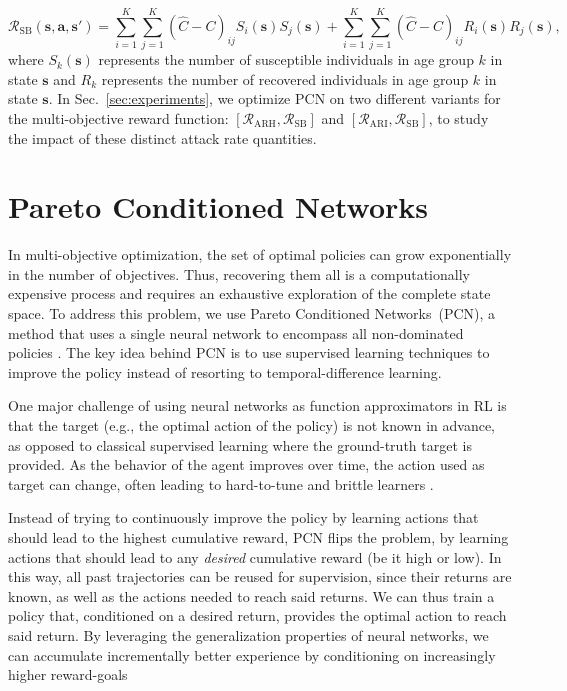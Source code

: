 \documentclass{article}
\renewcommand{\cite}[1]{\citep{#1}}
\newcommand{\mdprewardfn}{\mathcal{R}}
\newcommand{\mdpstate}{\mathbf{s}}
\newcommand{\mdpaction}{\mathbf{a}}
\newcommand{\agegroups}{K}
\begin{document}
\begin{equation}
    \mdprewardfn_{\text{SB}}(\mdpstate,\mdpaction,\mdpstate') = \sum_{i=1}^{\agegroups}\sum_{j=1}^{\agegroups}(\hat{C}-C)_{ij}S_i(\mdpstate)S_j(\mdpstate) + \sum_{i=1}^{\agegroups}\sum_{j=1}^{\agegroups}(\hat{C}-C)_{ij}R_i(\mdpstate)R_j(\mdpstate),
\end{equation}
where $S_k(\mdpstate)$ represents the number of susceptible individuals in age group $k$ in state $\mdpstate$ and $R_k$ represents the number of recovered individuals in age group $k$ in state $\mdpstate$. In Sec.~\ref{sec:experiments}, we optimize PCN on two different variants for the multi-objective reward function: $[\mdprewardfn_\text{ARH}, \mdprewardfn_\text{SB}]$ and $[\mdprewardfn_\text{ARI}, \mdprewardfn_\text{SB}]$, to study the impact of these distinct attack rate quantities.


\section{Pareto Conditioned Networks}
In multi-objective optimization, the set of optimal policies can grow exponentially in the number of objectives. Thus, recovering them all is a computationally expensive process and requires an exhaustive exploration of the complete state space. To address this problem, we use Pareto Conditioned Networks~(PCN), a method that uses a single neural network to encompass all non-dominated policies \cite{reymond2022pcn}. The key idea behind PCN is to use supervised learning techniques to improve the policy instead of resorting to temporal-difference learning. %

One major challenge of using neural networks as function approximators in RL is that the target (e.g., the optimal action of the policy) is not known in advance, as opposed to classical supervised learning where the ground-truth target is provided. As the behavior of the agent improves over time, the action used as target can change, often leading to hard-to-tune and brittle learners \cite{mnih2015,fu2019}.

Instead of trying to continuously improve the policy by learning actions that should lead to the highest cumulative reward, PCN flips the problem, by learning actions that should lead to any \emph{desired} cumulative reward (be it high or low). In this way, all past trajectories can be reused for supervision, since their returns are known, as well as the actions needed to reach said returns. We can thus train a policy that, conditioned on a desired return, provides the optimal action to reach said return. By leveraging the generalization properties of neural networks, we can accumulate incrementally better experience by conditioning on increasingly higher reward-goals
\end{document}
